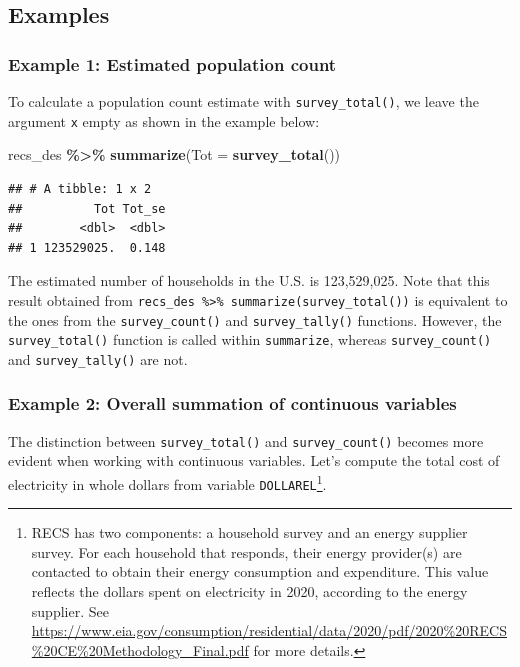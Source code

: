 \documentclass[
]{krantz}
\makeatletter
\newenvironment{Shaded}{\begin{snugshade}}{\end{snugshade}}
\newcommand{\AttributeTok}[1]{\textcolor[rgb]{0.27,0.27,0.27}{#1}}
\newcommand{\FunctionTok}[1]{\textcolor[rgb]{0.27,0.27,0.27}{\textbf{#1}}}
\newcommand{\NormalTok}[1]{#1}
\newcommand{\SpecialCharTok}[1]{\textcolor[rgb]{0.43,0.43,0.43}{\textbf{#1}}}
\newenvironment{kframe}{%
\medskip{}
\setlength{\fboxsep}{.8em}
 \def\at@end@of@kframe{}%
 \ifinner\ifhmode%
  \def\at@end@of@kframe{\end{minipage}}%
  \begin{minipage}{\columnwidth}%
 \fi\fi%
 \def\FrameCommand##1{\hskip\@totalleftmargin \hskip-\fboxsep
 \colorbox{shadecolor}{##1}\hskip-\fboxsep
     \hskip-\linewidth \hskip-\@totalleftmargin \hskip\columnwidth}%
 \MakeFramed {\advance\hsize-\width
   \@totalleftmargin\z@ \linewidth\hsize
   \@setminipage}}%
 {\par\unskip\endMakeFramed%
 \at@end@of@kframe}
\renewenvironment{Shaded}{\begin{kframe}}{\end{kframe}}
\makeatother
\begin{document}
\hypertarget{examples-1}{%
\subsection{Examples}\label{examples-1}}

\hypertarget{example-1-estimated-population-count-1}{%
\subsubsection*{Example 1: Estimated population count}\label{example-1-estimated-population-count-1}}


To calculate a population count estimate with \texttt{survey\_total()}, we leave the argument \texttt{x} empty as shown in the example below:

\begin{Shaded}
\begin{Highlighting}[]
\NormalTok{recs\_des }\SpecialCharTok{\%\textgreater{}\%}
  \FunctionTok{summarize}\NormalTok{(}\AttributeTok{Tot =} \FunctionTok{survey\_total}\NormalTok{())}
\end{Highlighting}
\end{Shaded}

\begin{verbatim}
## # A tibble: 1 x 2
##          Tot Tot_se
##        <dbl>  <dbl>
## 1 123529025.  0.148
\end{verbatim}

The estimated number of households in the U.S. is 123,529,025. Note that this result obtained from \texttt{recs\_des\ \%\textgreater{}\%\ summarize(survey\_total())} is equivalent to the ones from the \texttt{survey\_count()} and \texttt{survey\_tally()} functions. However, the \texttt{survey\_total()} function is called within \texttt{summarize}, whereas \texttt{survey\_count()} and \texttt{survey\_tally()} are not.

\hypertarget{example-2-overall-summation-of-continuous-variables}{%
\subsubsection*{Example 2: Overall summation of continuous variables}\label{example-2-overall-summation-of-continuous-variables}}


The distinction between \texttt{survey\_total()} and \texttt{survey\_count()} becomes more evident when working with continuous variables. Let's compute the total cost of electricity in whole dollars from variable \texttt{DOLLAREL}\footnote{RECS has two components: a household survey and an energy supplier survey. For each household that responds, their energy provider(s) are contacted to obtain their energy consumption and expenditure. This value reflects the dollars spent on electricity in 2020, according to the energy supplier. See \url{https://www.eia.gov/consumption/residential/data/2020/pdf/2020\%20RECS\%20CE\%20Methodology_Final.pdf} for more details.}.
\end{document}
